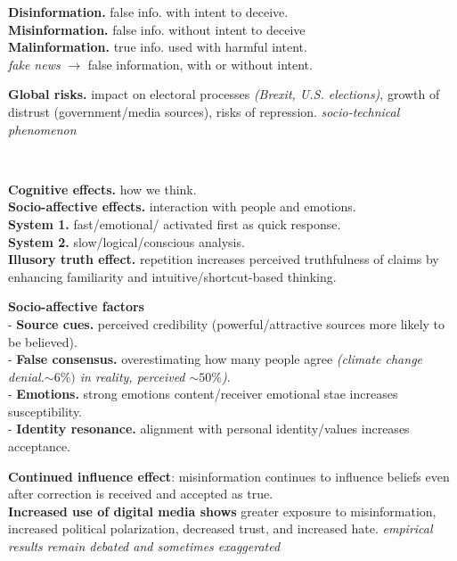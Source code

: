 \documentclass[8pt, a4paper]{extarticle}
\begin{document}
\begin{minipage}[t]{0.48\textwidth}
{\begin{minipage}[t]{1\textwidth}
\begin{minipage}[t]{0.545\textwidth}
				\textbf{Disinformation.} false info. with intent to deceive.\\
				\textbf{Misinformation.} false info. without intent to deceive\\
				\textbf{Malinformation.} true info. used with harmful intent.\\
				\emph{fake news} $\to$ false information, with or without intent.
			\end{minipage}\hfill\vline\hfill
			\begin{minipage}[t]{0.445\textwidth}
				\textbf{Global risks.} impact on electoral processes \textit{(Brexit, U.S. elections)}, growth of distrust (government/media sources), risks of repression. \textit{socio-technical phenomenon}
			\end{minipage}\\
			\begin{minipage}[htp]{0.44\textwidth}
				\textbf{Cognitive effects.} how we think.\\
				\textbf{Socio-affective effects.} interaction with people and emotions.\\
				\textbf{System 1.} fast/emotional/ activated first as quick response.\\
				\textbf{System 2.} slow/logical/conscious analysis.\\
				\textbf{Illusory truth effect.} repetition increases perceived truthfulness of claims by enhancing familiarity and intuitive/shortcut-based thinking.
			\end{minipage}\hfill\vline\hfill
			\begin{minipage}[htp]{0.55\textwidth}
				\textbf{Socio-affective factors}\\
				- \textbf{Source cues.} perceived credibility (powerful/attractive sources more likely to be believed).\\
				- \textbf{False consensus.} overestimating how many people agree \textit{(climate change denial.\(\sim 6\%)\) in reality, perceived \(\sim 50\%\))}.\\
				- \textbf{Emotions.} strong emotions content/receiver emotional stae increases susceptibility.\\
				- \textbf{Identity resonance.} alignment with personal identity/values increases acceptance.
			\end{minipage}
			\textbf{Continued influence effect}: misinformation continues to influence beliefs even after correction is received and accepted as true.\\
			\textbf{Increased use of digital media shows} greater exposure to misinformation, increased political polarization, decreased trust, and increased hate. \textit{empirical results remain debated and sometimes exaggerated}

\end{minipage}}
\end{minipage}
\end{document}
